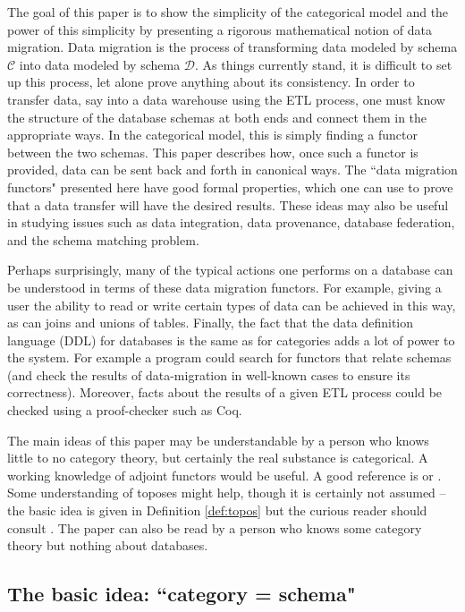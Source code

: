 \documentclass{amsart}
\def\mc{\mathcal}
\def\mcC{\mc{C}}
\def\mcD{\mc{D}}
\theoremstyle{remark}
\theoremstyle{definition}
\begin{document}
The goal of this paper is to show the simplicity of the categorical model and the power of this simplicity by presenting a rigorous mathematical notion of data migration.  Data migration is the process of transforming data modeled by schema $\mcC$ into data modeled by schema $\mcD$.  As things currently stand, it is difficult to set up this process, let alone prove anything about its consistency.  In order to transfer data, say into a data warehouse using the ETL process, one must know the structure of the database schemas at both ends and connect them in the appropriate ways.  In the categorical model, this is simply finding a functor between the two schemas.  This paper describes how, once such a functor is provided, data can be sent back and forth in canonical ways.  The ``data migration functors" presented here have good formal properties, which one can use to prove that a data transfer will have the desired results.  These ideas may also be useful in studying issues such as data integration, data provenance, database federation, and the schema matching problem.

Perhaps surprisingly, many of the typical actions one performs on a database can be understood in terms of these data migration functors.  For example, giving a user the ability to read or write certain types of data can be achieved in this way, as can joins and unions of tables.  Finally, the fact that the data definition language (DDL) for databases is the same as for categories adds a lot of power to the system.  For example a program could search for functors that relate schemas (and check the results of data-migration in well-known cases to ensure its correctness).  Moreover, facts about the results of a given ETL process could be checked using a proof-checker such as Coq.

The main ideas of this paper may be understandable by a person who knows little to no category theory, but certainly the real substance is categorical.  A working knowledge of adjoint functors would be useful.  A good reference is \cite{P1} or \cite{M}.  Some understanding of toposes might help, though it is certainly not assumed -- the basic idea is given in Definition \ref{def:topos} but the curious reader should consult \cite{MM}.  The paper can also be read by a person who knows some category theory but nothing about databases.

\subsection{The basic idea: ``category = schema"}
\end{document}
